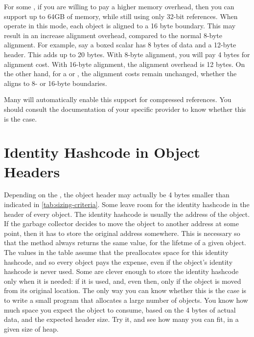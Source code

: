 For some \jres, if you are willing to pay a higher memory overhead, then you can
support up to 64GB of memory, while still using only 32-bit references. When
\jres operate in this mode, each object is aligned to a 16 byte boundary. This
may result in an increase alignment overhead, compared to the normal 8-byte
alignment. For example, say a  boxed scalar has 8 bytes of data
and a 12-byte header. This adds up to 20 bytes. With 8-byte alignment, you will
pay 4 bytes for alignment cost. With 16-byte alignment, the alignment overhead
is 12 bytes. On the other hand, for a  or , the
alignment costs remain unchanged, whether the \jre aligns to 8- or 16-byte
boundaries.

Many \jres will automatically enable this support for compressed references. You
should consult the documentation of your specific \jre provider to know whether
this is the case.

\section{Identity Hashcode in Object Headers}

Depending on the \jre, the object header may actually be 4 bytes smaller than
indicated in \autoref{tab:sizing-criteria}. Some \jres leave room for the
identity hashcode in the header of every object. The identity hashcode is
usually the address of the object. If the garbage collector decides to move the
object to another address at some point, then it has to store the original
address somewhere. This is necessary so that the  method
always returns the same value, for the lifetme of a given object. The values in
the table assume that the \jre preallocates space for this identity hashcode,
and so every object pays the expense, even if the object's identity hashcode is
never used. Some \jres are clever enough to store the identity hashcode only
when it is needed: if it is used, and, even then, only if the object is moved
from its original location. The only way you can know whether this is the case
is to write a small program that allocates a large number of 
objects. You know how much space you expect the object to consume, based on the
4 bytes of actual data, and the expected header size. Try it, and see how many
you can fit, in a given size of heap.

